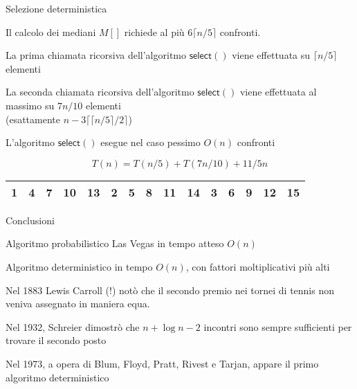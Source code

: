 \begin{frame}{Selezione deterministica}

\BIL
\item  Il calcolo dei mediani $M[]$ richiede al più $6 \lceil n/5 \rceil$  confronti.
\item La prima chiamata ricorsiva dell'algoritmo $\textsf{select}()$ viene effettuata su $\lceil n/5 \rceil$ elementi
\item La seconda chiamata ricorsiva dell'algoritmo $\textsf{select}()$ viene effettuata al massimo  su $7n/10$ elementi\\
 (esattamente $n - 3 \lceil  \lceil n/5 \rceil /2 \rceil$) 
\item L'algoritmo $\textsf{select}()$ esegue nel caso pessimo $O(n)$ confronti

\[
  T(n) = T(n/5) + T(7n/10) + 11/5n
\]
\EIL

\begin{center}
\begin{tabular}{|c|c|c|c|c||c|c|c|c|c||c|c|c|c|c|}
\hline
\alert{1} & \alert{4} & \alert{\textbf{7}} & 10 & 13 & \alert{2} & \alert{5} & \alert{\textbf{8}} & 11 & 14 & 3 & 6 & \textbf{9} & 12 & 15 \\\hline
\end{tabular}
\end{center}

\end{frame}

\begin{frame}{Conclusioni}

\BIL
\item Algoritmo probabilistico Las Vegas in tempo atteso $O(n)$
\item Algoritmo deterministico in tempo $O(n)$, con fattori moltiplicativi
  più alti
\EIL


\bigskip
{}
\BIL
\item Nel 1883 Lewis Carroll (!) notò che il secondo premio nei tornei di tennis non veniva assegnato in maniera equa.
\item Nel 1932, Schreier dimostrò che $n + \log n - 2$  incontri sono sempre sufficienti per trovare il secondo posto
\item Nel 1973, a opera di Blum, Floyd, Pratt, Rivest e Tarjan, appare il primo algoritmo deterministico
\EIL
\end{frame}







